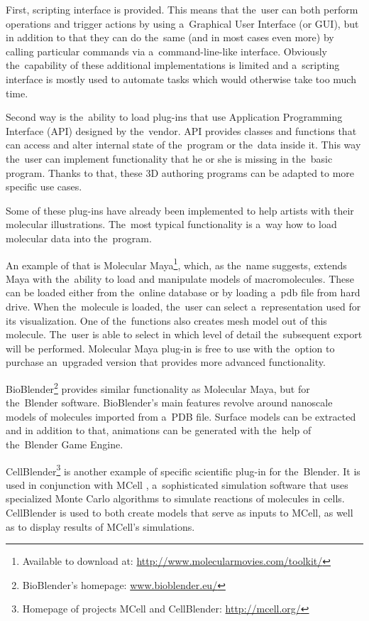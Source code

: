 \documentclass[
  digital, %
  table,   %
  nolof,     %
  nolot,     %
  oneside,
]{fithesis3}
\begin{document}
First, scripting interface is provided. This means that the user can both perform operations and trigger actions by using a Graphical User Interface (or GUI), but in addition to that they can do the same (and in most cases even more) by calling particular commands via a command-line-like interface. Obviously the capability of these additional implementations is limited and a scripting interface is mostly used to automate tasks which would otherwise take too much time.

Second way is the ability to load plug-ins that use Application Programming Interface (API) designed by the vendor. API provides classes and functions that can access and alter internal state of the program or the data inside it. This way the user can implement functionality that he or she is missing in the basic program. Thanks to that, these 3D authoring programs can be adapted to more specific use cases.

Some of these plug-ins have already been implemented to help artists with their molecular illustrations. The most typical functionality is a way how to load molecular data into the program.

An example of that is Molecular Maya\footnote{Available to download at: \url{http://www.molecularmovies.com/toolkit/}}, which, as the name suggests, extends Maya with the ability to load and manipulate models of macromolecules. These can be loaded either from the online database or by loading a pdb file from hard drive. When the molecule is loaded, the user can select a representation used for its visualization. One of the functions also creates mesh model out of this molecule. The user is able to select in which level of detail the subsequent export will be performed. Molecular Maya plug-in is free to use with the option to purchase an upgraded version that provides more advanced functionality.

BioBlender\footnote{BioBlender's homepage: \url{www.bioblender.eu/}} provides similar functionality as Molecular Maya, but for the Blender software. BioBlender's main features revolve around nanoscale models of molecules imported from a PDB file. Surface models can be extracted and in addition to that, animations can be generated with the help of the Blender Game Engine.

CellBlender\footnote{Homepage of projects MCell and CellBlender: \url{http://mcell.org/}} is another example of specific scientific plug-in for the Blender. It is used in conjunction with MCell \cite{mcell}, a sophisticated simulation software that uses specialized Monte Carlo algorithms to simulate reactions of molecules in cells. CellBlender is used to both create models that serve as inputs to MCell, as well as to display results of MCell's simulations.
\end{document}
